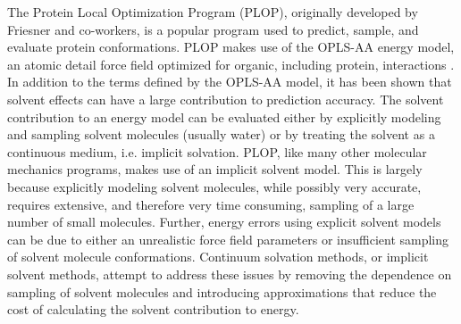 The Protein Local Optimization Program (PLOP), originally developed by Friesner and co-workers, is a popular program used to predict, sample, and evaluate protein conformations\cite{jacobson2002role,jacobson2002force,jacobson2004hierarchical}.
PLOP makes use of the OPLS-AA energy model, an atomic detail force field optimized for organic, including protein, interactions \cite{jorgensen1996development}.
In addition to the terms defined by the OPLS-AA model, it has been shown that solvent effects can have a large contribution to prediction accuracy.
The solvent contribution to an energy model can be evaluated either by explicitly modeling and sampling solvent molecules (usually water) or by treating the solvent as a continuous medium, i.e. implicit solvation.
PLOP, like many other molecular mechanics programs, makes use of an implicit solvent model.
This is largely because explicitly modeling solvent molecules, while possibly very accurate, requires extensive, and therefore very time consuming, sampling of a large number of small molecules\cite{zhang2001solvent}.
Further, energy errors using explicit solvent models can be due to either an unrealistic force field parameters or insufficient sampling of solvent molecule conformations\cite{zhou2003free}.
Continuum solvation methods, or implicit solvent methods, attempt to address these issues by removing the dependence on sampling of solvent molecules and introducing approximations that reduce the cost of calculating the solvent contribution to energy\cite{roux1999implicit}.

